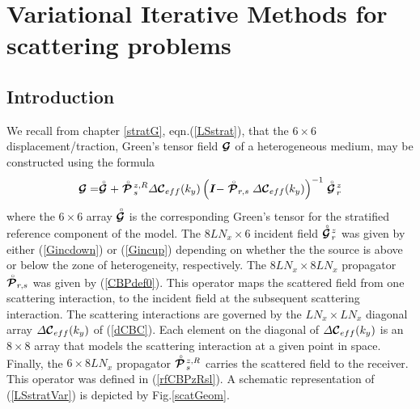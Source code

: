 \chapter{Variational Iterative Methods for scattering problems } 
\label{variational}


\section{Introduction}

We recall from chapter \ref{stratG}, eqn.(\ref{LSstrat}), that the 
$6\times 6$ 
displacement/traction, Green's tensor field 
${\mbox{\boldmath$\cal G$\unboldmath}}$  of a heterogeneous medium,   may be constructed using the 
formula
\begin{equation} \label{LSstratVar}
{\mbox{\boldmath$\cal G$\unboldmath}}=\stackrel{\scriptscriptstyle _{\,\,\circ}}{ \mbox{\boldmath$\cal G$\unboldmath}}+
\stackrel{\scriptscriptstyle _{\,\,\circ}}{ \mbox{\boldmath$\cal P$\unboldmath}}\!{}^{z,R}_{s} 
{\mit \Delta}{\mbox{\boldmath$\cal C$\unboldmath}}{}_{eff}(k_y)
\left({\mbox{\boldmath$\mit I$\unboldmath}} -  
\stackrel{\scriptscriptstyle _{\,\,\circ}}{ \mbox{\boldmath$\cal P$\unboldmath}}_{r,s}
{\mit \Delta}{\mbox{\boldmath$\cal C$\unboldmath}}{}_{eff}(k_y)\right)^{-1} 
\stackrel{\scriptscriptstyle _{\,\,\circ}}{ \mbox{\boldmath$\cal G$\unboldmath}}\!{}^{z}_{r}
\end{equation}
where the $6\times 6$ array $\stackrel{\scriptscriptstyle _{\,\,\circ}}{ \mbox{\boldmath$\cal G$\unboldmath}}$ is the corresponding Green's 
tensor for the stratified 
reference component of the model. The $8 L N_x \times 6$ incident field 
$\stackrel{\scriptscriptstyle _{\,\,\circ}}{ \mbox{\boldmath$\cal G$\unboldmath}}\!{}^{z}_{r}$ was given by 
either (\ref{Gincdown}) or (\ref{Gincup}) depending on whether the the 
source is above 
or below the zone of heterogeneity, respectively. The  $8 L N_x \times 8 L 
N_x $ propagator
$\stackrel{\scriptscriptstyle _{\,\,\circ}}{ \mbox{\boldmath$\cal P$\unboldmath}}_{r,s}$ was given by (\ref{CBPdef0}).
 This operator maps the scattered field from one scattering interaction, 
to 
the  incident field at the subsequent scattering interaction.
The scattering interactions are governed by the $L N_x \times L N_x$ 
diagonal array
${\mit \Delta}{\mbox{\boldmath$\cal C$\unboldmath}}{}_{eff}(k_y)$ of (\ref{dCBC}). Each 
element on the diagonal of ${\mit \Delta}{\mbox{\boldmath$\cal C$\unboldmath}}{}_{eff}(k_y)$ is  an 
$8 \times 8$ array that models the scattering interaction at a given point 
in space. 
Finally, the $6 \times 8 L N_x $ propagator
$\stackrel{\scriptscriptstyle _{\,\,\circ}}{ \mbox{\boldmath$\cal P$\unboldmath}}\!{}^{z,R}_{s}$ carries the scattered field to the 
receiver. This operator was defined in (\ref{rfCBPzRsl}). A schematic 
representation of (\ref{LSstratVar}) is depicted by Fig.\ref{scatGeom}.




